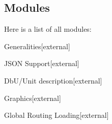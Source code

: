 \subsection{Modules}
Here is a list of all modules\+:\begin{DoxyCompactList}
\item {}
\item {}
\item Generalities{\ttfamily  \mbox{[}external\mbox{]}}\item J\+S\+ON Support{\ttfamily  \mbox{[}external\mbox{]}}\item Db\+U/\+Unit description{\ttfamily  \mbox{[}external\mbox{]}}\item Graphics{\ttfamily  \mbox{[}external\mbox{]}}\item Global Routing Loading{\ttfamily  \mbox{[}external\mbox{]}}\end{DoxyCompactList}
